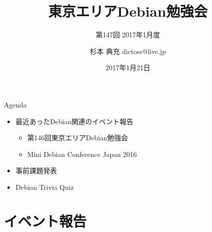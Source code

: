 \title{東京エリアDebian勉強会}
\subtitle{第147回 2017年1月度}
\author{杉本 典充  dictoss@live.jp}
\date{2017年1月21日}



\begin{frame}
\titlepage{}
\end{frame}

\begin{frame}{Agenda}
 \begin{minipage}[t]{0.45\hsize}
  \begin{itemize}
  \item 最近あったDebian関連のイベント報告
	\begin{itemize}
	\item 第146回東京エリアDebian勉強会
    \item Mini Debian Conference Japan 2016
	\end{itemize}
  \item 事前課題発表
  \end{itemize}
 \end{minipage}
 \begin{minipage}[t]{0.45\hsize}
  \begin{itemize}
   \item Debian Trivia Quiz
  \end{itemize}
 \end{minipage}
\end{frame}

\section{イベント報告}

